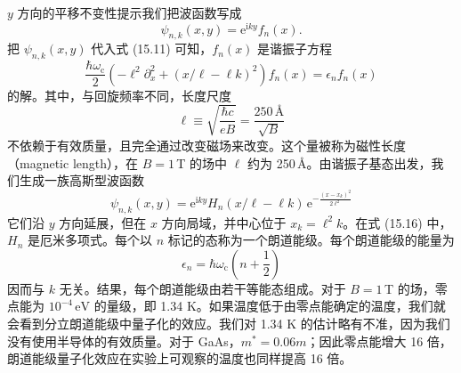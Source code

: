 $y$ 方向的平移不变性提示我们把波函数写成
\begin{equation*}
\psi_{n,k}(x,y)=\mathrm{e}^{\mathrm{i}ky}f_{n}(x).\tag{15.13}
\end{equation*}
把 $\psi_{n,k}(x,y)$ 代入式 (15.11) 可知，$f_{n}(x)$ 是谐振子方程
\begin{equation*}
\frac{\hbar\omega_{\mathrm{c}}}{2}\left(-\ell^{2}\partial_{x}^{2}+\left(x/\ell-\ell k\right)^{2}\right)f_{n}(x)=\epsilon_{n}f_{n}(x)\tag{15.14}
\end{equation*}
的解。其中，与回旋频率不同，长度尺度
\begin{equation*}
\ell\equiv\sqrt{\frac{\hbar c}{eB}}=\frac{250\,\text{\AA}}{\sqrt{B}}\tag{15.15}
\end{equation*}
不依赖于有效质量，且完全通过改变磁场来改变。这个量被称为磁性长度（magnetic length），在 $B=1\,$T 的场中 $\ell$ 约为 250\,\AA。由谐振子基态出发，我们生成一族高斯型波函数
\begin{equation*}
\psi_{n,k}(x,y)=\mathrm{e}^{\mathrm{i}ky}H_{n}(x/\ell-\ell k)\,\mathrm{e}^{-\frac{(x-x_{k})^{2}}{2\ell^{2}}}\tag{15.16}
\end{equation*}
它们沿 $y$ 方向延展，但在 $x$ 方向局域，并中心位于 $x_{k}=\ell^{2}k$。在式 (15.16) 中，$H_{n}$ 是厄米多项式。每个以 $n$ 标记的态称为一个朗道能级。每个朗道能级的能量为
\begin{equation*}
\epsilon_{n}=\hbar\omega_{\mathrm{c}}\left(n+\frac{1}{2}\right)\tag{15.17}
\end{equation*}
因而与 $k$ 无关。结果，每个朗道能级由若干等能态组成。对于 $B=1\,$T 的场，零点能为 $10^{-4}\,\mathrm{eV}$ 的量级，即 1.34 K。如果温度低于由零点能确定的温度，我们就会看到分立朗道能级中量子化的效应。我们对 1.34 K 的估计略有不准，因为我们没有使用半导体的有效质量。对于 GaAs，$m^{*}=0.06m$；因此零点能增大 16 倍，朗道能级量子化效应在实验上可观察的温度也同样提高 16 倍。

